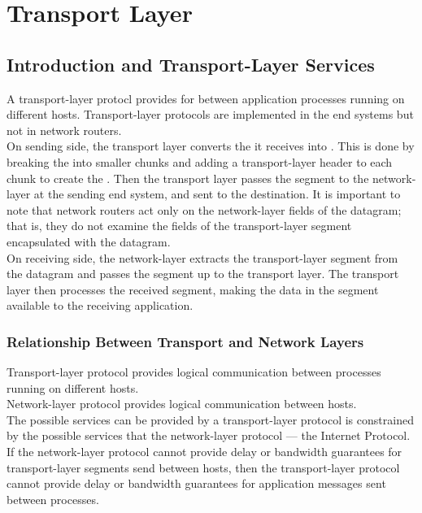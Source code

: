 \chapter{Transport Layer}

\section{Introduction and Transport-Layer Services}

\hf A transport-layer protocl provides for  between application processes running
on different hosts. Transport-layer protocols are implemented in the end systems but not in network
routers.\\

On sending side, the transport layer converts the  it receives into .
This is done by breaking the  into smaller chunks and adding a transport-layer header to each
chunk to create the . Then the transport layer passes the segment to the network-layer at the sending
end system, and sent to the destination. It is important to note that network routers act only
on the network-layer fields of the datagram; that is, they do not examine the fields of the transport-layer
segment encapsulated with the datagram.\\

On receiving side, the network-layer extracts the transport-layer segment from the datagram and passes the 
segment up to the transport layer. The transport layer then processes the received segment, making
the data in the segment available to the receiving application.

\subsection{Relationship Between Transport and Network Layers}

Transport-layer protocol provides logical communication between processes running on different hosts.\\

Network-layer protocol provides logical communication between hosts.\\

The possible services can be provided by a transport-layer protocol is constrained by the possible services
that the network-layer protocol --- the Internet Protocol. If the network-layer protocol cannot provide
delay or bandwidth guarantees for transport-layer segments send between hosts, then the transport-layer protocol cannot provide
delay or bandwidth guarantees for application messages sent between processes.\\


